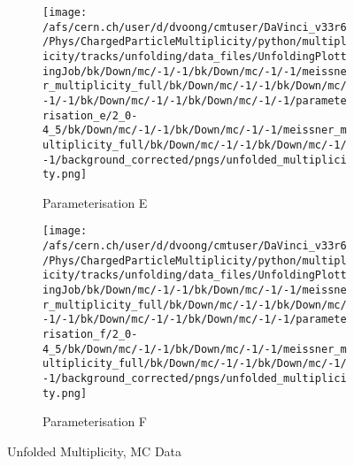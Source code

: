 \begin{figure}[H]
\begin{subfigure}{0.49\textwidth}
	\end{subfigure}
	\begin{subfigure}{0.49\textwidth}
		\texttt{[image: /afs/cern.ch/user/d/dvoong/cmtuser/DaVinci\_v33r6/Phys/ChargedParticleMultiplicity/python/multiplicity/tracks/unfolding/data\_files/UnfoldingPlottingJob/bk/Down/mc/-1/-1/bk/Down/mc/-1/-1/meissner\_multiplicity\_full/bk/Down/mc/-1/-1/bk/Down/mc/-1/-1/bk/Down/mc/-1/-1/bk/Down/mc/-1/-1/parameterisation\_e/2\_0-4\_5/bk/Down/mc/-1/-1/bk/Down/mc/-1/-1/meissner\_multiplicity\_full/bk/Down/mc/-1/-1/bk/Down/mc/-1/-1/background\_corrected/pngs/unfolded\_multiplicity.png]}
		\caption{Parameterisation E}
	\end{subfigure}
	\begin{subfigure}{0.49\textwidth}
		\texttt{[image: /afs/cern.ch/user/d/dvoong/cmtuser/DaVinci\_v33r6/Phys/ChargedParticleMultiplicity/python/multiplicity/tracks/unfolding/data\_files/UnfoldingPlottingJob/bk/Down/mc/-1/-1/bk/Down/mc/-1/-1/meissner\_multiplicity\_full/bk/Down/mc/-1/-1/bk/Down/mc/-1/-1/bk/Down/mc/-1/-1/bk/Down/mc/-1/-1/parameterisation\_f/2\_0-4\_5/bk/Down/mc/-1/-1/bk/Down/mc/-1/-1/meissner\_multiplicity\_full/bk/Down/mc/-1/-1/bk/Down/mc/-1/-1/background\_corrected/pngs/unfolded\_multiplicity.png]}
		\caption{Parameterisation F}
	\end{subfigure}
	\caption{Unfolded Multiplicity, MC Data}
	\label{fig: unfolded multiplicity, mc data}
\end{figure}
